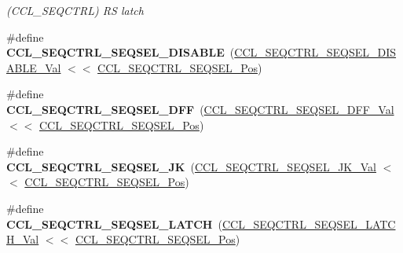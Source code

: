 \begin{DoxyCompactItemize}
\begin{DoxyCompactList}\small\item\em (C\+C\+L\+\_\+\+S\+E\+Q\+C\+T\+R\+L) R\+S latch \end{DoxyCompactList}\item 
\hypertarget{group___s_a_m_l21___c_c_l_ga3ce6bba2d979f470b7c68de55661d5c8}{}\#define {\bfseries C\+C\+L\+\_\+\+S\+E\+Q\+C\+T\+R\+L\+\_\+\+S\+E\+Q\+S\+E\+L\+\_\+\+D\+I\+S\+A\+B\+L\+E}~(\hyperlink{group___s_a_m_l21___c_c_l_gaba921443415ad6fa30496a97f2276865}{C\+C\+L\+\_\+\+S\+E\+Q\+C\+T\+R\+L\+\_\+\+S\+E\+Q\+S\+E\+L\+\_\+\+D\+I\+S\+A\+B\+L\+E\+\_\+\+Val} $<$$<$ \hyperlink{group___s_a_m_l21___c_c_l_gab6ac81501f16a9835f3eee86922b8f3e}{C\+C\+L\+\_\+\+S\+E\+Q\+C\+T\+R\+L\+\_\+\+S\+E\+Q\+S\+E\+L\+\_\+\+Pos})\label{group___s_a_m_l21___c_c_l_ga3ce6bba2d979f470b7c68de55661d5c8}

\item 
\hypertarget{group___s_a_m_l21___c_c_l_gab949a6063daaac74a5c5f06f8d30d41c}{}\#define {\bfseries C\+C\+L\+\_\+\+S\+E\+Q\+C\+T\+R\+L\+\_\+\+S\+E\+Q\+S\+E\+L\+\_\+\+D\+F\+F}~(\hyperlink{group___s_a_m_l21___c_c_l_ga0a98c9dc1d2c6f66e8d7c5d3443c7d47}{C\+C\+L\+\_\+\+S\+E\+Q\+C\+T\+R\+L\+\_\+\+S\+E\+Q\+S\+E\+L\+\_\+\+D\+F\+F\+\_\+\+Val}    $<$$<$ \hyperlink{group___s_a_m_l21___c_c_l_gab6ac81501f16a9835f3eee86922b8f3e}{C\+C\+L\+\_\+\+S\+E\+Q\+C\+T\+R\+L\+\_\+\+S\+E\+Q\+S\+E\+L\+\_\+\+Pos})\label{group___s_a_m_l21___c_c_l_gab949a6063daaac74a5c5f06f8d30d41c}

\item 
\hypertarget{group___s_a_m_l21___c_c_l_gacd498bf403407ca80ae90f5f539d141d}{}\#define {\bfseries C\+C\+L\+\_\+\+S\+E\+Q\+C\+T\+R\+L\+\_\+\+S\+E\+Q\+S\+E\+L\+\_\+\+J\+K}~(\hyperlink{group___s_a_m_l21___c_c_l_ga002d4f2fedfc437e6a45f144ec5ab49c}{C\+C\+L\+\_\+\+S\+E\+Q\+C\+T\+R\+L\+\_\+\+S\+E\+Q\+S\+E\+L\+\_\+\+J\+K\+\_\+\+Val}     $<$$<$ \hyperlink{group___s_a_m_l21___c_c_l_gab6ac81501f16a9835f3eee86922b8f3e}{C\+C\+L\+\_\+\+S\+E\+Q\+C\+T\+R\+L\+\_\+\+S\+E\+Q\+S\+E\+L\+\_\+\+Pos})\label{group___s_a_m_l21___c_c_l_gacd498bf403407ca80ae90f5f539d141d}

\item 
\hypertarget{group___s_a_m_l21___c_c_l_ga6bd3a2f604a3c4826405d26f9d283fbe}{}\#define {\bfseries C\+C\+L\+\_\+\+S\+E\+Q\+C\+T\+R\+L\+\_\+\+S\+E\+Q\+S\+E\+L\+\_\+\+L\+A\+T\+C\+H}~(\hyperlink{group___s_a_m_l21___c_c_l_ga3583624dff7abfed78f90739f9483bf5}{C\+C\+L\+\_\+\+S\+E\+Q\+C\+T\+R\+L\+\_\+\+S\+E\+Q\+S\+E\+L\+\_\+\+L\+A\+T\+C\+H\+\_\+\+Val}  $<$$<$ \hyperlink{group___s_a_m_l21___c_c_l_gab6ac81501f16a9835f3eee86922b8f3e}{C\+C\+L\+\_\+\+S\+E\+Q\+C\+T\+R\+L\+\_\+\+S\+E\+Q\+S\+E\+L\+\_\+\+Pos})\label{group___s_a_m_l21___c_c_l_ga6bd3a2f604a3c4826405d26f9d283fbe}


\end{DoxyCompactItemize}
